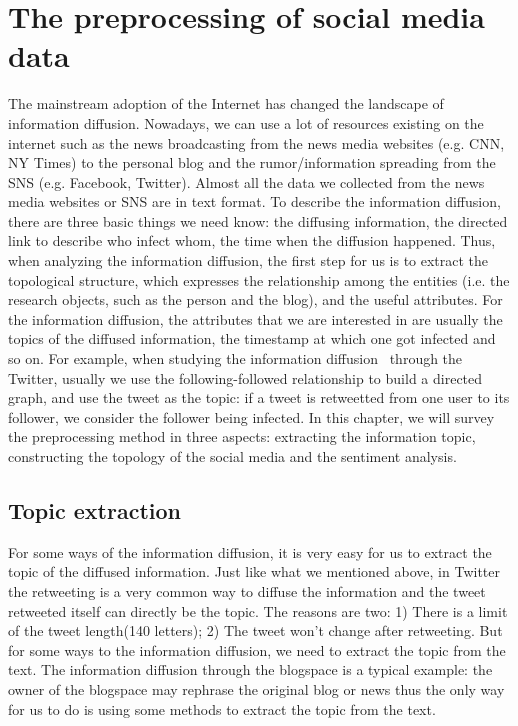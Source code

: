 \chapter{The preprocessing of social media data}
\label{chap:mining}
 
The mainstream adoption of the Internet has changed the landscape of
information diffusion. Nowadays, we can use a lot of resources existing
on the internet such as the news broadcasting from the news media
websites (e.g. CNN, NY Times) to the personal blog and the
rumor/information spreading from the SNS (e.g. Facebook,
Twitter). Almost all the data we collected from the news media
websites or SNS are in text format. To describe the information
diffusion, there are three basic things we need know: the diffusing
information, the directed link to describe who infect whom, the time
when the diffusion happened. Thus, when analyzing the information
diffusion, the first step for us is to extract the topological
structure, which expresses the relationship among the entities
(i.e. the research objects, such as the person and the blog), and the
useful attributes.  For the information diffusion, the attributes that
we are interested in are usually the topics of the diffused
information, the timestamp at which one got infected and so on. For
example, when studying the information
diffusion~\cite{cha2010measuring} through the Twitter, usually we use
the following-followed relationship to build a directed graph, and use
the tweet as the topic: if a tweet is retweetted from one user to its
follower, we consider the follower being infected.  In this chapter, we
will survey the preprocessing method in three aspects: extracting the
information topic, constructing the topology of the social media and
the sentiment analysis. 

\section{Topic extraction}

For some ways of the information diffusion, it is very easy for us
to extract the topic of the diffused information. Just like what we
mentioned above, in Twitter the retweeting is a very common way to
diffuse the information and the tweet retweeted itself can directly be
the topic. The reasons are two: 1) There is a limit of the tweet length(140
letters); 2) The tweet won't change after retweeting. But for some
ways to the information diffusion, we need to extract the topic from
the text. The information diffusion through the blogspace is a
typical example: the owner of the blogspace may rephrase the original
blog or news thus the only way for us to do is using some methods to
extract the topic from the text. 

